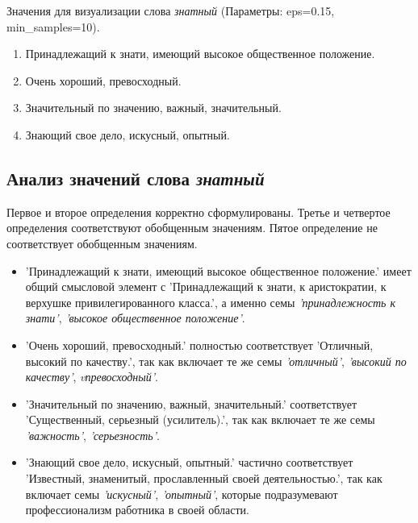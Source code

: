 Значения для визуализации слова \textit{знатный} (Параметры: eps=0.15, min\_samples=10).

\begin{enumerate}
    \item Принадлежащий к знати, имеющий высокое общественное положение.
    \item Очень хороший, превосходный.
    \item Значительный по значению, важный, значительный.
    \item Знающий свое дело, искусный, опытный.
\end{enumerate}

\subsection*{Анализ значений слова \textit{знатный}}

Первое и второе определения корректно сформулированы.
Третье и четвертое определения соответствуют обобщенным значениям.
Пятое определение не соответствует обобщенным значениям.

\begin{itemize}
    \item ’Принадлежащий к знати, имеющий высокое общественное положение.’ имеет общий смысловой элемент с
’Принадлежащий к знати, к аристократии, к верхушке привилегированного класса.’,
а именно семы \textit{’принадлежность к знати’}, \textit{’высокое общественное положение’}.

    \item ’Очень хороший, превосходный.’ полностью соответствует ’Отличный, высокий по качеству.’,
так как включает те же семы \textit{’отличный’}, \textit{’высокий по качеству’}, \textit{vпревосходный’}.

    \item ’Значительный по значению, важный, значительный.’ соответствует
’Существенный, серьезный (усилитель).’, так как включает те же семы \textit{’важность’}, \textit{’серьезность’}.

    \item ’Знающий свое дело, искусный, опытный.’ частично соответствует
’Известный, знаменитый, прославленный своей деятельностью.’,
так как включает семы \textit{’искусный’}, \textit{’опытный’}, которые подразумевают профессионализм работника в своей области.
\end{itemize}


